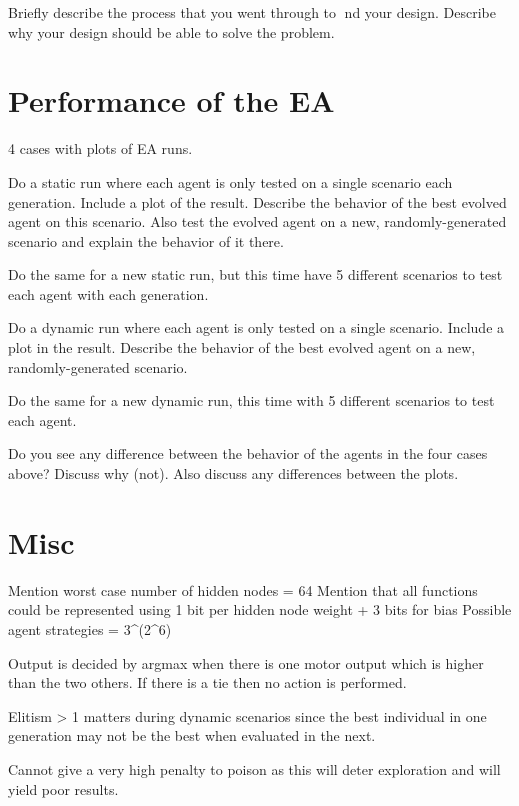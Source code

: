 Briefly describe the process that you went through to nd your design. Describe why your design should be able to solve the problem.

\section{Performance of the \ac{EA}}

4 cases with plots of EA runs.

Do a static run where each agent is only tested on a single scenario each generation. Include a plot of the result. Describe the behavior of the best evolved agent on this scenario. Also test the evolved agent on a new, randomly-generated scenario and explain the behavior of it there.

Do the same for a new static run, but this time have 5 different scenarios to test each agent with each generation.

Do a dynamic run where each agent is only tested on a single scenario. Include a plot in the result. Describe the behavior of the best evolved agent on a new, randomly-generated scenario.

Do the same for a new dynamic run, this time with 5 different scenarios to test each agent.

Do you see any difference between the behavior of the agents in the four cases above? Discuss why (not). Also discuss any differences between the plots.

\section{Misc}

Mention worst case number of hidden nodes = 64
Mention that all functions could be represented using 1 bit per hidden node weight + 3 bits for bias
Possible agent strategies = 3^(2^6)

Output is decided by argmax when there is one motor output which is higher than the two others. If there is a tie then no action is performed.

Elitism > 1 matters during dynamic scenarios since the best individual in one generation may not be the best when evaluated in the next.

Cannot give a very high penalty to poison as this will deter exploration and will yield poor results.



